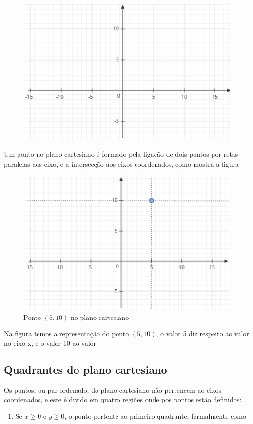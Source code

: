 \begin{multicols*}{2}
\begin{figure}[H]
        \includegraphics[scale=0.5]{assets/rafael/img25.png}
    \end{figure}
    Um ponto no plano cartesiano é formado pela ligação de dois pontos por retas paralelas aos eixo, e a intersecção aos eixos coordenados, como mostra a figura
    \begin{figure}[H]
    \caption{Ponto $(5,10)$ no plano cartesiano}
        \includegraphics[scale=0.5]{assets/rafael/img26.png}
    \end{figure}
    
    Na figura temos a representação do ponto $(5,10)$, o valor 5 diz respeito ao valor no eixo x, e o valor 10 ao valor 
    \subsection*{Quadrantes do plano cartesiano}
    Os pontos, ou par ordenado, do plano cartesiano não pertencem ao eixos coordenados, e este é divido em quatro regiões onde pos pontos estão definidos:
    \begin{enumerate}
    \item Se $x \ge 0$ e $y \ge 0$, o ponto pertente ao primeiro quadrante, formalmente como 
    

\end{enumerate}
\end{multicols*}

